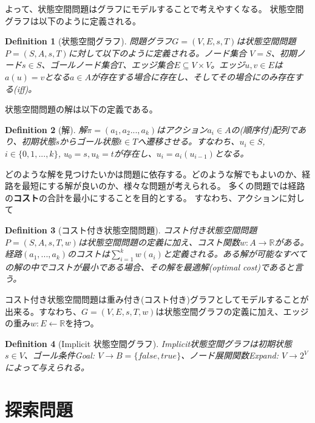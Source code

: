 \documentclass{book}
\newtheorem{definition}{Definition}
\begin{document}
よって、状態空間問題はグラフにモデルすることで考えやすくなる。
状態空間グラフは以下のように定義される。

\begin{definition}[状態空間グラフ]
問題グラフ$G = (V, E, s, T)$は状態空間問題$P = (S, A, s, T)$に対して以下のように定義される。ノード集合 $V = S$、初期ノード$s \in S$、ゴールノード集合$T$、エッジ集合$E\subseteq V \times V$。エッジ$u,v\in E$は$a(u) = v$となる$a\in A$が存在する場合に存在し、そしてその場合にのみ存在する(iff)。
\end{definition}

状態空間問題の解は以下の定義である。

\begin{definition}[解]
解$\pi = (a_1,a_2...,a_k)$はアクション$a_i \in A$の(順序付)配列であり、初期状態$s$からゴール状態$t \in T$へ遷移させる。すなわち、$u_i \in S$,$i \in \{0,1,...,k\}$, $u_0 = s, u_k = t$が存在し、$u_i = a_i(u_{i-1})$となる。
\end{definition}

どのような解を見つけたいかは問題に依存する。どのような解でもよいのか、経路を最短にする解が良いのか、様々な問題が考えられる。
多くの問題では経路の{\bf コスト}の合計を最小にすることを目的とする。
すなわち、アクションに対して

\begin{definition}[コスト付き状態空間問題]
コスト付き状態空間問題$P = (S, A, s, T, w)$は状態空間問題の定義に加え、コスト関数$w: A \rightarrow \mathbb{R}$がある。経路$(a_1,...,a_k)$のコストは$\sum^k_{i=1}w(a_i)$と定義される。ある解が可能なすべての解の中でコストが最小である場合、その解を最適解(optimal cost)であると言う。
\end{definition}

コスト付き状態空間問題は重み付き(コスト付き)グラフとしてモデルすることが出来る。すなわち、$G = (V, E, s, T, w)$は状態空間グラフの定義に加え、エッジの重み$w: E \leftarrow \mathbb{R}$を持つ。

\begin{definition}[Implicit 状態空間グラフ]
Implicit状態空間グラフは初期状態$s \in V$、ゴール条件Goal: $V \rightarrow B = \{false, true\}$、ノード展開関数Expand: $V \rightarrow 2^V$によって与えられる。
\end{definition}



\section{探索問題}
\end{document}
